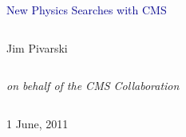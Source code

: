 \documentclass[compress]{beamer}
\begin{document}
\begin{frame}
\vfill
\begin{center}
\textcolor{darkblue}{\Large New Physics Searches with CMS}

\vfill
\begin{columns}
\begin{center}
\large
Jim Pivarski
\end{center}
\end{columns}

\begin{columns}
\begin{center}
\scriptsize
{\it on behalf of the CMS Collaboration}
\end{center}
\end{columns}

\vfill
 1 June, 2011

\end{center}
\end{frame}


\small

\end{document}
